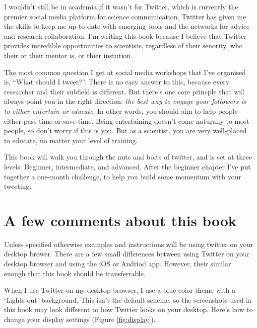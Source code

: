 \documentclass[]{book}
\begin{document}
I wouldn't still be in academia if it wasn't for Twitter, which is currently the premier social media platform for science communication. Twitter has given me the skills to keep me up-to-date with emerging tools and the networks for advice and research collaboration. I'm writing this book because I believe that Twitter provides incredible opportunities to scientists, regardless of their senority, who their or their mentor is, or thier instution.

The most common question I get at social media workshops that I've organised is, ``What should I tweet?''. There is no easy answer to this, because every researcher and their subfield is different. But there's one core princple that will always point you in the right direction: \emph{the best way to engage your followers is to either entertain or educate}. In other words, you should aim to help people either pass time or save time. Being entertaining doesn't come naturally to most people, so don't worry if this is you. But as a scientist, you are very well-placed to educate, no matter your level of training.

This book will walk you through the nuts and bolts of twitter, and is set at three levels: Beginner, intermediate, and advanced. After the beginner chapter I've put together a one-month challenge, to help you build some momentum with your tweeting.

\hypertarget{a-few-comments-about-this-book}{%
\section*{A few comments about this book}\label{a-few-comments-about-this-book}}

Unless specified otherwise examples and instructions will be using twitter on your desktop brower. There are a few small differences between using Twitter on your desktop browser and using the iOS or Andriod app. However, their similar enough that this book should be transferrable.

When I use Twitter on my desktop browser, I use a blue color theme with a `Lights out' background. This isn't the default scheme, so the screenshots used in this book may look different to how Twitter looks on your desktop. Here's how to change your display settings (Figure \ref{fig:display}).
\end{document}
